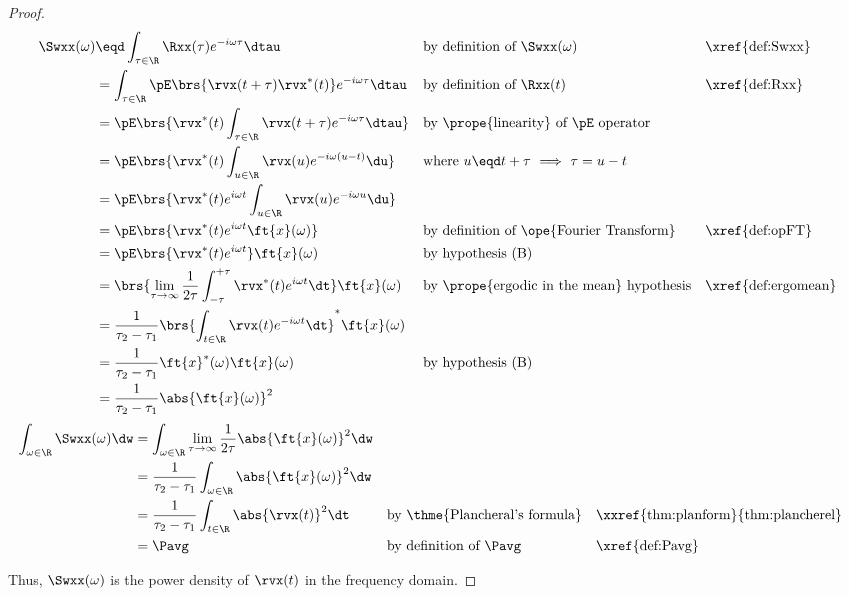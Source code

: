 \begin{proof}
\begin{align*}
   \Swxx(\omega)
     &\eqd \int_{\tau\in\R}\Rxx(\tau) e^{-i\omega\tau} \dtau
     &&    \text{by definition of $\Swxx(\omega)$}
     &&    \text{\xref{def:Swxx}}
   \\&=    \int_{\tau\in\R}\pE\brs{\rvx(t+\tau)\rvx^\ast(t)} e^{-i\omega\tau} \dtau
     &&    \text{by definition of $\Rxx(t)$}
     &&    \text{\xref{def:Rxx}}
   \\&=    \pE\brs{\rvx^\ast(t) \int_{\tau\in\R}\rvx(t+\tau) e^{-i\omega\tau} \dtau }
     &&    \text{by \prope{linearity} of $\pE$ operator}
   \\&=    \pE\brs{\rvx^\ast(t) \int_{u\in\R}\rvx(u) e^{-i\omega(u-t)} \du }
     &&    \text{where $u\eqd t+\tau$ $\implies$ $\tau=u-t$}
   \\&=    \pE\brs{\rvx^\ast(t)e^{i\omega t} \int_{u\in\R}\rvx(u) e^{-i\omega u} \du }
   \\&=    \pE\brs{\rvx^\ast(t)e^{i\omega t} \ft{x}(\omega) }
     &&    \text{by definition of \ope{Fourier Transform}}
     &&    \text{\xref{def:opFT}}
   \\&=    \pE\brs{\rvx^\ast(t)e^{i\omega t}} \ft{x}(\omega)
     &&    \text{by hypothesis (B)}
   \\&=    \brs{\lim_{\tau\to\infty}\frac{1}{2\tau}\int_{-\tau}^{+\tau} \rvx^\ast(t)e^{i\omega t} \dt} \ft{x}(\omega)
     &&    \text{by \prope{ergodic in the mean} hypothesis}
     &&    \text{\xref{def:ergomean}}
   \\&=    \frac{1}{\tau_2-\tau_1}\brs{\int_{t\in\R}\rvx(t)e^{-i\omega t} \dt}^\ast \ft{x}(\omega)
   \\&=    \frac{1}{\tau_2-\tau_1}\ft{x}^\ast(\omega) \ft{x}(\omega)
     &&    \text{by hypothesis (B)}
   \\&=    \frac{1}{\tau_2-\tau_1}\abs{\ft{x}(\omega)}^2
\end{align*}
\begin{align*}
   \int_{\omega\in\R} \Swxx(\omega) \dw
     &= \int_{\omega\in\R} \lim_{\tau\to\infty}\frac{1}{2\tau} \abs{\ft{x}(\omega)}^2 \dw
   \\&= \frac{1}{\tau_2-\tau_1} \int_{\omega\in\R} \abs{\ft{x}(\omega)}^2 \dw
   \\&= \frac{1}{\tau_2-\tau_1} \int_{t\in\R} \abs{\rvx(t)}^2 \dt
     && \text{by \thme{Plancheral's formula}}
     && \text{\xxref{thm:planform}{thm:plancherel}}
   \\&= \Pavg
     && \text{by definition of $\Pavg$}
     && \text{\xref{def:Pavg}}
\end{align*}

Thus, $\Swxx(\omega)$ is the power density of $\rvx(t)$ in the frequency domain.
\end{proof}

